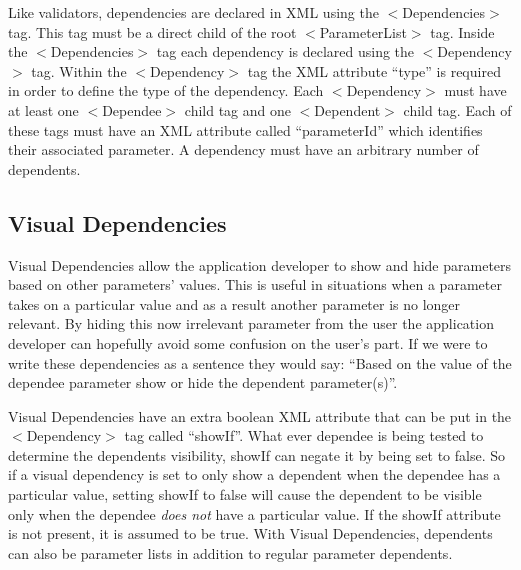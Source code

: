 Like validators, dependencies are declared in XML using the $<$Dependencies$>$ tag. This tag must be a direct child
of the root $<$ParameterList$>$ tag. Inside the $<$Dependencies$>$ tag each dependency is declared using the $<$Dependency$>$ tag. Within the
$<$Dependency$>$ tag the XML attribute ``type'' is required in order to define the type of the dependency. Each $<$Dependency$>$ must have at least
one $<$Dependee$>$ child tag and one $<$Dependent$>$ child tag. Each of these tags must have an XML attribute called ``parameterId'' which identifies
their associated parameter. A dependency must have an arbitrary number of dependents.

\subsection{Visual Dependencies}
Visual Dependencies allow the application developer to show and hide parameters based on other parameters' values. This is useful in situations
when a parameter takes on a particular value and as a result another parameter is no longer relevant. By hiding this now irrelevant parameter from the user the
application developer can hopefully avoid some confusion on the user's part. If we were to write these dependencies as a sentence they would say: ``Based on
the value of the dependee parameter show or hide the dependent parameter(s)''.

Visual Dependencies have an extra boolean XML attribute that can be put in the $<$Dependency$>$ tag called ``showIf''. What ever dependee is being tested to 
determine the dependents visibility, showIf can negate it by being set to false. So if a visual dependency is set to only show a dependent when the
dependee has a particular value, setting showIf to false will cause the dependent to be visible only when the dependee \emph{does not} have a particular
value. If the showIf attribute is not present, it is assumed to be true. With Visual Dependencies, dependents can also be parameter lists in addition to regular
parameter dependents.

